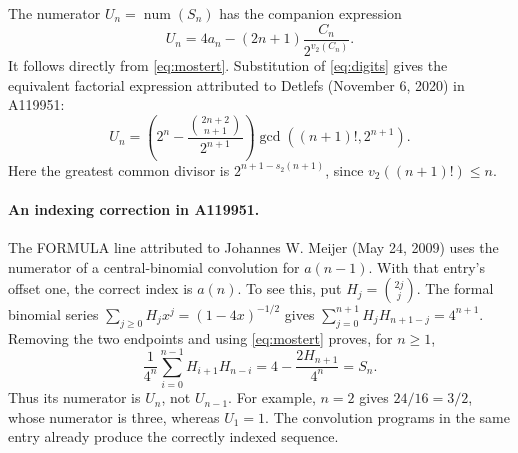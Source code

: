 \documentclass[11pt]{article}
\newcommand{\num}{\operatorname{num}}
\begin{document}
The numerator $U_n=\num(S_n)$ has the companion expression
\[
 U_n=4a_n-(2n+1)\frac{C_n}{2^{v_2(C_n)}}.
\]
It follows directly from \eqref{eq:mostert}. Substitution of
\eqref{eq:digits} gives the equivalent factorial expression
attributed to Detlefs (November 6, 2020) in A119951:
\[
 U_n=\left(2^n-\frac{\binom{2n+2}{n+1}}{2^{n+1}}\right)
       \gcd((n+1)!,2^{n+1}).
\]
Here the greatest common divisor is
$2^{n+1-s_2(n+1)}$, since $v_2((n+1)!)\leq n$.

\paragraph{An indexing correction in A119951.}
The FORMULA line attributed to Johannes W. Meijer (May 24, 2009)
uses the numerator of a central-binomial convolution for $a(n-1)$.
With that entry's offset one, the correct index is $a(n)$.
To see this, put $H_j=\binom{2j}{j}$. The formal binomial series
$\sum_{j\geq0}H_jx^j=(1-4x)^{-1/2}$ gives
$\sum_{j=0}^{n+1}H_jH_{n+1-j}=4^{n+1}$. Removing the two endpoints
and using \eqref{eq:mostert} proves, for $n\geq1$,
\[
 \frac{1}{4^n}\sum_{i=0}^{n-1}H_{i+1}H_{n-i}
 =4-\frac{2H_{n+1}}{4^n}=S_n.
\]
Thus its numerator is $U_n$, not $U_{n-1}$.
For example, $n=2$ gives $24/16=3/2$, whose numerator is three,
whereas $U_1=1$. The convolution programs in the same entry
already produce the correctly indexed sequence.
\end{document}
